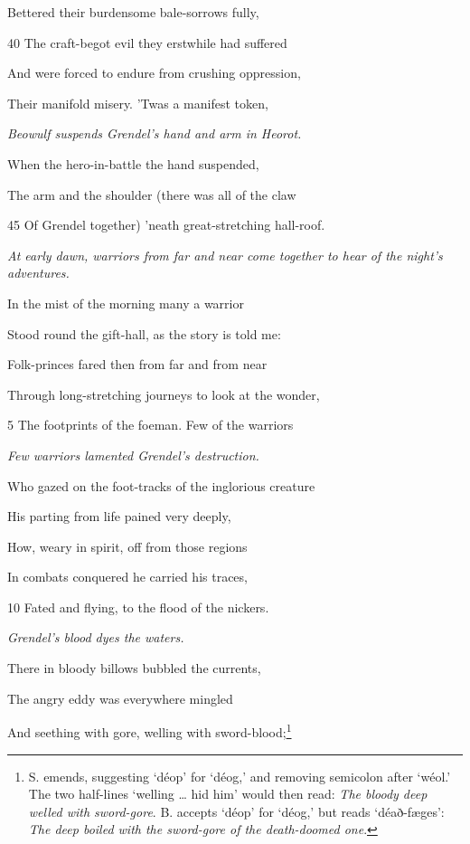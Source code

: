 Bettered their burdensome bale-sorrows fully,

40
The craft-begot evil they erstwhile had suffered

And were forced to endure from crushing oppression,

Their manifold misery. ’Twas a manifest token,

\emph{Beowulf suspends
Grendel’s hand and
arm in Heorot.}

When the hero-in-battle the hand suspended,

The arm and the shoulder (there was all of the claw

45
Of Grendel together) ’neath great-stretching hall-roof.



\emph{At early dawn,
warriors from far
and near come together
to hear of
the night’s adventures.}

In the mist of the morning many a warrior

Stood round the gift-hall, as the story is told me:

Folk-princes fared then from far and from near

Through long-stretching journeys to look at the wonder,

5
The footprints of the foeman. Few of the warriors

\emph{Few warriors lamented
Grendel’s
destruction.}

Who gazed on the foot-tracks of the inglorious creature

His parting from life pained very deeply,

How, weary in spirit, off from those regions

In combats conquered he carried his traces,

10
Fated and flying, to the flood of the nickers.

\emph{Grendel’s blood
dyes the waters.}

There in bloody billows bubbled the currents,

The angry eddy was everywhere mingled

And seething with gore, welling with sword-blood;\footnote{S. emends, suggesting ‘déop’ for ‘déog,’ and removing semicolon after
‘wéol.’ The two half-lines ‘welling … hid him’ would then read: \emph{The
bloody deep welled with sword-gore}. B. accepts ‘déop’ for ‘déog,’ but reads
‘déað-fæges’: \emph{The deep boiled with the sword-gore of the death-doomed one}.}

